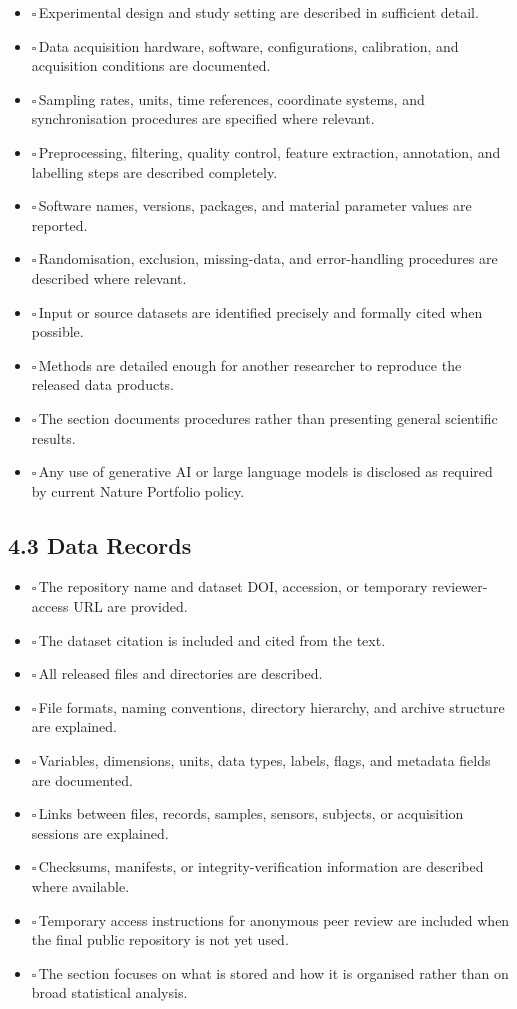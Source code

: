 \documentclass[11pt]{article}
\newcommand{\cbox}{$\square$\,}
\begin{document}
\begin{itemize}
    \item \cbox Experimental design and study setting are described in sufficient detail.
    \item \cbox Data acquisition hardware, software, configurations, calibration, and acquisition conditions are documented.
    \item \cbox Sampling rates, units, time references, coordinate systems, and synchronisation procedures are specified where relevant.
    \item \cbox Preprocessing, filtering, quality control, feature extraction, annotation, and labelling steps are described completely.
    \item \cbox Software names, versions, packages, and material parameter values are reported.
    \item \cbox Randomisation, exclusion, missing-data, and error-handling procedures are described where relevant.
    \item \cbox Input or source datasets are identified precisely and formally cited when possible.
    \item \cbox Methods are detailed enough for another researcher to reproduce the released data products.
    \item \cbox The section documents procedures rather than presenting general scientific results.
    \item \cbox Any use of generative AI or large language models is disclosed as required by current Nature Portfolio policy.
\end{itemize}

\subsection*{4.3 Data Records}

\begin{itemize}
    \item \cbox The repository name and dataset DOI, accession, or temporary reviewer-access URL are provided.
    \item \cbox The dataset citation is included and cited from the text.
    \item \cbox All released files and directories are described.
    \item \cbox File formats, naming conventions, directory hierarchy, and archive structure are explained.
    \item \cbox Variables, dimensions, units, data types, labels, flags, and metadata fields are documented.
    \item \cbox Links between files, records, samples, sensors, subjects, or acquisition sessions are explained.
    \item \cbox Checksums, manifests, or integrity-verification information are described where available.
    \item \cbox Temporary access instructions for anonymous peer review are included when the final public repository is not yet used.
    \item \cbox The section focuses on what is stored and how it is organised rather than on broad statistical analysis.
\end{itemize}
\end{document}
